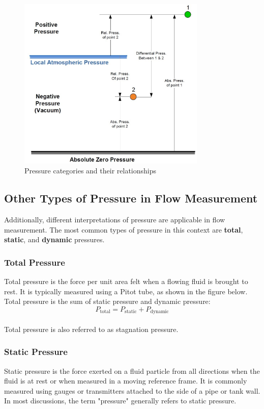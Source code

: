 \documentclass{article}
\begin{document}
	\begin{figure}[H]
		\centering
		\includegraphics[width=0.8\textwidth]{images/Pressure Diagram.jpg}
		\caption{Pressure categories and their relationships}
		\label{fig:pressure_diagram}
	\end{figure}
	
	\subsection{Other Types of Pressure in Flow Measurement}
	Additionally, different interpretations of pressure are applicable in flow measurement. The most common types of pressure in this context are \textbf{total}, \textbf{static}, and \textbf{dynamic} pressures.
	
	\subsubsection{Total Pressure}
	Total pressure is the force per unit area felt when a flowing fluid is brought to rest. It is typically measured using a Pitot tube, as shown in the figure below. Total pressure is the sum of static pressure and dynamic pressure:\\[0.5em]
	\begin{equation}
		P_{\text{total}} = P_{\text{static}} + P_{\text{dynamic}}
		\label{eq:total}
	\end{equation}\\
	Total pressure is also referred to as stagnation pressure.
	\subsubsection{Static Pressure}
	Static pressure is the force exerted on a fluid particle from all directions when the fluid is at rest or when measured in a moving reference frame. It is commonly measured using gauges or transmitters attached to the side of a pipe or tank wall. In most discussions, the term "pressure" generally refers to static pressure.
\end{document}
